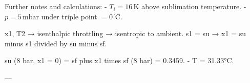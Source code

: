 Further notes and calculations:  
- \( T_i = 16 \, \text{K} \) above sublimation temperature.  
- \( p = 5 \, \text{mbar} \) under triple point \( = 0^\circ \text{C} \).

x1, T2 → isenthalpic throttling → isentropic to ambient.  
s1 = su → x1 = su minus s1 divided by su minus sf.  

su (8 bar, x1 = 0) = sf plus x1 times sf (8 bar) = 0.3459.  
- T = 31.33°C.  

---